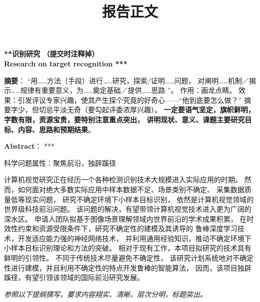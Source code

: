 \documentclass[12pt]{article}
\newcommand{\myEmph}[1]{\textbf{\textcolor[rgb]{0,0,0.25}{#1}}}
\begin{document}
\begin{center}\bf\Large ***识别研究 （提交时注释掉） \\

Research on target recognition *** 
\end{center}





\textbf{摘要}：
%
“用……方法（手段）进行……研究，探索/证明……问题，
对阐明……机制／揭示……规律有重要意义，为……奠定基础／提供……思路 ”。
作用：画龙点睛。
效果：引发评议专家兴趣，使其产生探个究竟的好奇心——“他到底要怎么做？”
摘要字少，但切忌平淡无奇（要勾起评委浓厚兴趣）。
\myEmph{一定要语气坚定，旗帜鲜明，字数有限，资源宝贵，要特别注意重点突出，
讲明现状、意义、课题主要研究目标、内容、思路和预期结果}。



\textbf{Abstract}：
***


科学问题属性：聚焦前沿，独辟蹊径



计算机视觉研究正在经历一个各种检测识别技术大规模进入实际应用的时期。
然而，如何面对绝大多数实际应用中样本数据不足、场景类别不确定、
采集数据质量低等现实问题，
研究不确定环境下小样本目标识别，
依然是计算机视觉领域的世界级科技前沿问题。
%
该问题的解决，有望带领计算机视觉技术进入更为广阔的深水区。
申请人团队拟基于图像场景理解领域内世界前沿的学术成果积累，
在时效性约束和资源受限条件下，研究不确定性的建模及其诱导的
鲁棒深度学习技术，开发适应能力强的神经网络技术，
并利用通用经验知识，推动不确定环境下小样本目标识别理论和方法的突破。
%
相对于现有工作，本项目拟研究的技术具有鲜明的引领性。
不同于传统技术尽量避免不确定性，
该研究计划系统地对不确定性进行建模，并且利用不确定性的特点开发鲁棒的智能算法，
因而，该项目独辟蹊径，有望引领该领域的国际前沿研究发展。


\clearpage


\title{报告正文}

\maketitle

\emph{\large 参照以下提纲撰写，要求内容翔实、清晰，层次分明，标题突出。
}




\end{document}
